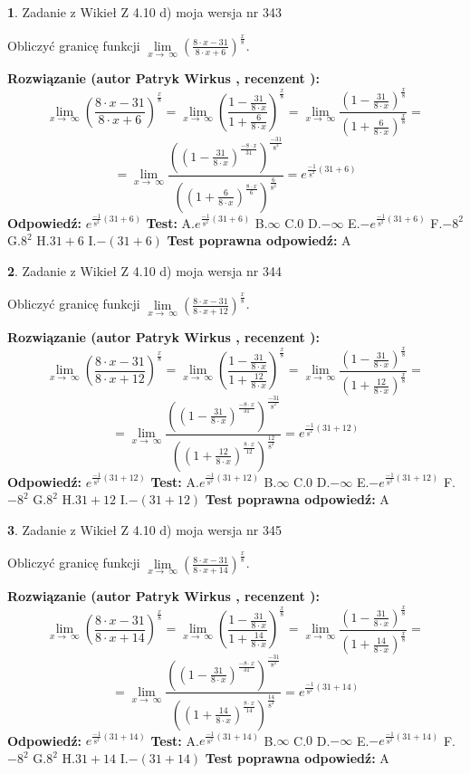 \documentclass[12pt, a4paper]{article}
\theoremstyle{definition} %
\newtheorem{zad}{}
\newcommand{\zadStart}[1]{\begin{zad}#1\newline}
\newcommand{\zadStop}{\end{zad}}
\newcommand{\rozwStart}[2]{\noindent \textbf{Rozwiązanie (autor #1 , recenzent #2): }\newline}
\newcommand{\rozwStop}{\newline}
\newcommand{\odpStart}{\noindent \textbf{Odpowiedź:}\newline}
\newcommand{\odpStop}{\newline}
\newcommand{\testStart}{\noindent \textbf{Test:}\newline}
\newcommand{\testStop}{\newline}
\newcommand{\kluczStart}{\noindent \textbf{Test poprawna odpowiedź:}\newline}
\newcommand{\kluczStop}{\newline}
\begin{document}
\zadStart{Zadanie z Wikieł Z 4.10 d) moja wersja nr 343}


Obliczyć granicę funkcji  $\lim\limits_{x\to\ \infty}(\frac{8\cdot x-31}{8\cdot x+6})^{\frac{x}{8}}$.
\zadStop
\rozwStart{Patryk Wirkus}{}
$$\lim\limits_{x\to\ \infty}(\frac{8\cdot x-31}{8\cdot x+6})^{\frac{x}{8}} = \lim\limits_{x\to\ \infty}(\frac{1-\frac{31}{8\cdot x}}{1+\frac{6}{8\cdot x}})^{\frac{x}{8}}=\lim\limits_{x\to\ \infty}\frac{(1-\frac{31}{8\cdot x})^{\frac{x}{8}}}{(1+\frac{6}{8\cdot x})^{\frac{x}{8}}}=$$
$$=\lim\limits_{x\to\ \infty}\frac{((1-\frac{31}{8\cdot x})^{\frac{-8\cdot x}{31}})^{\frac{-31}{8^{2}}}}{((1+\frac{6}{8\cdot x})^{\frac{8\cdot x}{6}})^{\frac{6}{8^{2}}}}=e^{\frac{-1}{8^{2}}(31+6)}$$
\rozwStop
\odpStart
$e^{\frac{-1}{8^{2}}(31+6)}$
\odpStop
\testStart
A.$e^{\frac{-1}{8^{2}}(31+6)}$ B.$\infty$ C.$0$ D.$-\infty$ E.$-e^{\frac{-1}{8^{2}}(31+6)}$
F.$-8^{2}$ G.$8^{2}$
H.$31+6$
I.$-(31+6)$
\testStop
\kluczStart
A
\kluczStop



\zadStart{Zadanie z Wikieł Z 4.10 d) moja wersja nr 344}


Obliczyć granicę funkcji  $\lim\limits_{x\to\ \infty}(\frac{8\cdot x-31}{8\cdot x+12})^{\frac{x}{8}}$.
\zadStop
\rozwStart{Patryk Wirkus}{}
$$\lim\limits_{x\to\ \infty}(\frac{8\cdot x-31}{8\cdot x+12})^{\frac{x}{8}} = \lim\limits_{x\to\ \infty}(\frac{1-\frac{31}{8\cdot x}}{1+\frac{12}{8\cdot x}})^{\frac{x}{8}}=\lim\limits_{x\to\ \infty}\frac{(1-\frac{31}{8\cdot x})^{\frac{x}{8}}}{(1+\frac{12}{8\cdot x})^{\frac{x}{8}}}=$$
$$=\lim\limits_{x\to\ \infty}\frac{((1-\frac{31}{8\cdot x})^{\frac{-8\cdot x}{31}})^{\frac{-31}{8^{2}}}}{((1+\frac{12}{8\cdot x})^{\frac{8\cdot x}{12}})^{\frac{12}{8^{2}}}}=e^{\frac{-1}{8^{2}}(31+12)}$$
\rozwStop
\odpStart
$e^{\frac{-1}{8^{2}}(31+12)}$
\odpStop
\testStart
A.$e^{\frac{-1}{8^{2}}(31+12)}$ B.$\infty$ C.$0$ D.$-\infty$ E.$-e^{\frac{-1}{8^{2}}(31+12)}$
F.$-8^{2}$ G.$8^{2}$
H.$31+12$
I.$-(31+12)$
\testStop
\kluczStart
A
\kluczStop



\zadStart{Zadanie z Wikieł Z 4.10 d) moja wersja nr 345}


Obliczyć granicę funkcji  $\lim\limits_{x\to\ \infty}(\frac{8\cdot x-31}{8\cdot x+14})^{\frac{x}{8}}$.
\zadStop
\rozwStart{Patryk Wirkus}{}
$$\lim\limits_{x\to\ \infty}(\frac{8\cdot x-31}{8\cdot x+14})^{\frac{x}{8}} = \lim\limits_{x\to\ \infty}(\frac{1-\frac{31}{8\cdot x}}{1+\frac{14}{8\cdot x}})^{\frac{x}{8}}=\lim\limits_{x\to\ \infty}\frac{(1-\frac{31}{8\cdot x})^{\frac{x}{8}}}{(1+\frac{14}{8\cdot x})^{\frac{x}{8}}}=$$
$$=\lim\limits_{x\to\ \infty}\frac{((1-\frac{31}{8\cdot x})^{\frac{-8\cdot x}{31}})^{\frac{-31}{8^{2}}}}{((1+\frac{14}{8\cdot x})^{\frac{8\cdot x}{14}})^{\frac{14}{8^{2}}}}=e^{\frac{-1}{8^{2}}(31+14)}$$
\rozwStop
\odpStart
$e^{\frac{-1}{8^{2}}(31+14)}$
\odpStop
\testStart
A.$e^{\frac{-1}{8^{2}}(31+14)}$ B.$\infty$ C.$0$ D.$-\infty$ E.$-e^{\frac{-1}{8^{2}}(31+14)}$
F.$-8^{2}$ G.$8^{2}$
H.$31+14$
I.$-(31+14)$
\testStop
\kluczStart
A
\kluczStop
\end{document}
